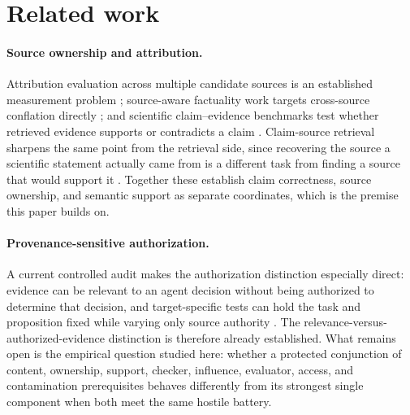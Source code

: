 \section{Related work}
\label{sec:related}

\paragraph{Source ownership and attribution.}
Attribution evaluation across multiple candidate sources is an established measurement problem \citep{attributionbench2024}; source-aware factuality work targets cross-source conflation directly \citep{provenanceguard2026}; and scientific claim--evidence benchmarks test whether retrieved evidence supports or contradicts a claim \citep{claimbench2025}. Claim-source retrieval sharpens the same point from the retrieval side, since recovering the source a scientific statement actually came from is a different task from finding a source that would support it \citep{claimsource2026}. Together these establish claim correctness, source ownership, and semantic support as separate coordinates, which is the premise this paper builds on.

\paragraph{Provenance-sensitive authorization.}
A current controlled audit makes the authorization distinction especially direct: evidence can be relevant to an agent decision without being authorized to determine that decision, and target-specific tests can hold the task and proposition fixed while varying only source authority \citep{provsen2026}. The relevance-versus-authorized-evidence distinction is therefore already established. What remains open is the empirical question studied here: whether a protected conjunction of content, ownership, support, checker, influence, evaluator, access, and contamination prerequisites behaves differently from its strongest single component when both meet the same hostile battery.

